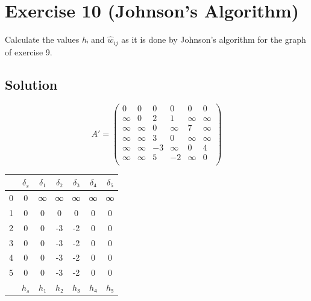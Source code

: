 \documentclass[a4paper, 12pt]{report}
\begin{document}
\section{Exercise 10 (Johnson’s Algorithm)}

Calculate the values $hᵢ$ and $\hat{w}_{ij}$ as it is done by Johnson’s
algorithm for the graph of exercise 9.

\subsection{Solution}

\begin{minipage}[b]{0.5\linewidth}
\[
A' =
\left(
    \begin{array}{cccccc}
        0   &   0   &   0   &   0   &   0   &  0    \\
        ∞   &   0   &   2   &   1   &   ∞   &  ∞    \\
        ∞   &   ∞   &   0   &   ∞   &   7   &  ∞    \\
        ∞   &   ∞   &   3   &   0   &   ∞   &  ∞    \\
        ∞   &   ∞   &   -3  &   ∞   &   0   &  4    \\
        ∞   &   ∞   &   5   &   -2  &   ∞   &  0    \\
    \end{array}
\right)
\]
\end{minipage}
\begin{minipage}[b]{0.5\linewidth}
\begin{center}
    \begin{tabular}{c|cccccc}
        &  $δ_s$ &  $δ₁$  &  $δ₂$  &  $δ₃$  &  $δ₄$  &  $δ₅$\\
    \hline
    0   &  0     &  ∞      &  ∞      &  ∞      &  ∞      &  ∞    \\
    1   &  0     &  0      &  0      &  0      &  0      &  0    \\
    2   &  0     &  0      &  -3     &  -2     &  0      &  0    \\
    3   &  0     &  0      &  -3     &  -2     &  0      &  0    \\
    4   &  0     &  0      &  -3     &  -2     &  0      &  0    \\
    5   &  0     &  0      &  -3     &  -2     &  0      &  0    \\
    \hline
        &  $h_s$ &  $h₁$  &  $h₂$  &  $h₃$  &  $h₄$  &  $h₅$\\
    \end{tabular}
\end{center}
\end{minipage}
\end{document}
